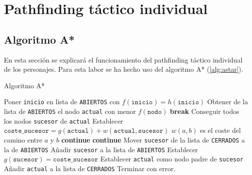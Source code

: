 \section{Pathfinding táctico individual}

\subsection{Algoritmo A*}

En esta sección se explicará el funcionamiento del pathfinding táctico individual de los personajes. Para esta labor se ha hecho uso del algoritmo A* (\ref{alg:astar}).

\begin{algorithm}
    \caption{Algoritmo A*}
    \label{alg:astar}
    \begin{algorithmic}[1]
         
        \State Poner \texttt{inicio} en lista de \texttt{ABIERTOS} con $f(\texttt{inicio}) = h(\texttt{inicio})$
        \State Obtener de la lista de \texttt{ABIERTOS} el nodo \texttt{actual} con menor $f(\texttt{nodo})$
         
        \State \textbf{break}
        \EndIf
        \State Conseguir todos los nodos \texttt{sucesor} de \texttt{actual}
        \State Establecer $\texttt{coste\_sucesor} = g(\texttt{actual}) + w(\texttt{actual}, \texttt{sucesor})$ \Comment $w(a,b)$ es el coste del camino entre $a$ y $b$
        \State \textbf{continue}
        \EndIf
        \State \textbf{continue}
        \EndIf
        \State Mover \texttt{sucesor} de la lista de \texttt{CERRADOS} a la de \texttt{ABIERTOS}
        \Else
        \State Añadir \texttt{sucesor} a la lista de \texttt{ABIERTOS}
        \EndIf
        \State Establecer $g(\texttt{sucesor}) = \texttt{coste\_sucesor}$
        \State Establecer \texttt{actual} como nodo padre de \texttt{sucesor}
        \EndFor
        \State Añadir \texttt{actual} a la lista de \texttt{CERRADOS}
        \EndWhile
         
        \State Terminar con error.
        \EndIf
        \EndProcedure
    \end{algorithmic}
\end{algorithm}

